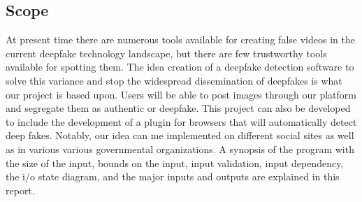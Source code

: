 \subsection{Scope}
At present time there are numerous tools available for creating false videos in the current deepfake technology landscape, but there are few trustworthy tools available for spotting them. The idea creation of a deepfake detection software to solve this variance and stop the widespread dissemination of deepfakes is what our project is based upon. Users will be able to post images through our platform and segregate them as authentic or deepfake. This project can also be developed to include the development of a plugin for browsers that will automatically detect deep fakes. Notably, our idea can me implemented on different social sites as well as in various various governmental organizations. A synopsis of the program with the size of the input, bounds on the input, input validation, input dependency, the i/o state diagram, and the major inputs and outputs are explained in this report.